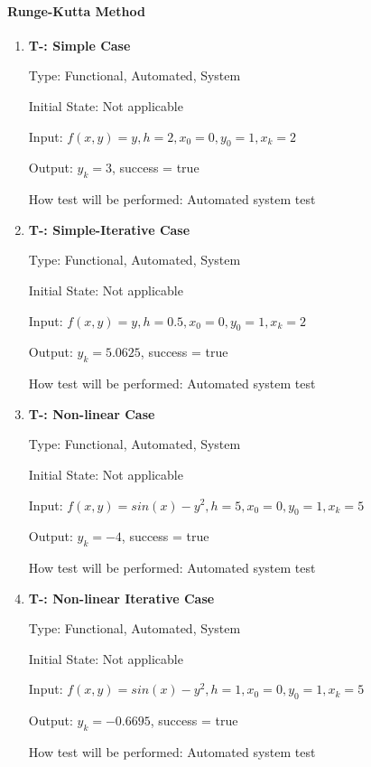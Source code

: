 \documentclass[12pt, titlepage]{article}
\newcounter{tnum} %
\begin{document}
\paragraph{Runge-Kutta Method}
\begin{enumerate}

\item{\textbf{T-\thetnum \label{t-rk_simple}: Simple Case}}

Type: Functional, Automated, System %
					
Initial State: Not applicable
					
Input: $f(x, y) = y, h = 2, x_0 = 0, y_0 = 1, x_k = 2$
					
Output: $y_k = 3$, success = true
					
How test will be performed: Automated system test

\item{\textbf{T-\thetnum \label{t-rk_simpleiterative}: Simple-Iterative Case}}

Type: Functional, Automated, System %
					
Initial State: Not applicable
					
Input: $f(x, y) = y, h = 0.5, x_0 = 0, y_0 = 1, x_k = 2$
					
Output: $y_k = 5.0625$, success = true
					
How test will be performed: Automated system test

\item{\textbf{T-\thetnum \label{t-rk_nonlinear}: Non-linear Case}}

Type: Functional, Automated, System %
					
Initial State: Not applicable
					
Input: $f(x, y) = sin(x) - y^2, h = 5, x_0 = 0, y_0 = 1, x_k = 5$
					
Output: $y_k = -4$, success = true
					
How test will be performed: Automated system test

\item{\textbf{T-\thetnum \label{t-rk_nonlineariterative}: Non-linear Iterative Case}}

Type: Functional, Automated, System %
					
Initial State: Not applicable
					
Input: $f(x, y) = sin(x) - y^2, h = 1, x_0 = 0, y_0 = 1, x_k = 5$
					
Output: $y_k = -0.6695$, success = true
					
How test will be performed: Automated system test

\end{enumerate}
\end{document}
